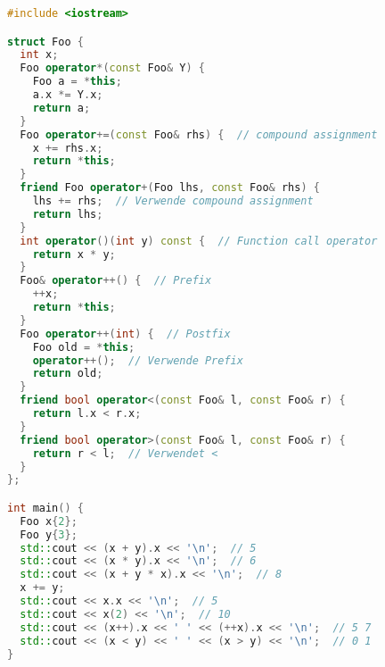 \begin{lstlisting}[language=C++]
#include <iostream>

struct Foo {
  int x;
  Foo operator*(const Foo& Y) {
    Foo a = *this;
    a.x *= Y.x;
    return a;
  }
  Foo operator+=(const Foo& rhs) {  // compound assignment
    x += rhs.x;
    return *this;
  }
  friend Foo operator+(Foo lhs, const Foo& rhs) {
    lhs += rhs;  // Verwende compound assignment
    return lhs;
  }
  int operator()(int y) const {  // Function call operator
    return x * y;
  }
  Foo& operator++() {  // Prefix
    ++x;
    return *this;
  }
  Foo operator++(int) {  // Postfix
    Foo old = *this;
    operator++();  // Verwende Prefix
    return old;
  }
  friend bool operator<(const Foo& l, const Foo& r) {
    return l.x < r.x;
  }
  friend bool operator>(const Foo& l, const Foo& r) {
    return r < l;  // Verwendet <
  }
};

int main() {
  Foo x{2};
  Foo y{3};
  std::cout << (x + y).x << '\n';  // 5
  std::cout << (x * y).x << '\n';  // 6
  std::cout << (x + y * x).x << '\n';  // 8
  x += y;
  std::cout << x.x << '\n';  // 5
  std::cout << x(2) << '\n';  // 10
  std::cout << (x++).x << ' ' << (++x).x << '\n';  // 5 7
  std::cout << (x < y) << ' ' << (x > y) << '\n';  // 0 1
}
\end{lstlisting}
